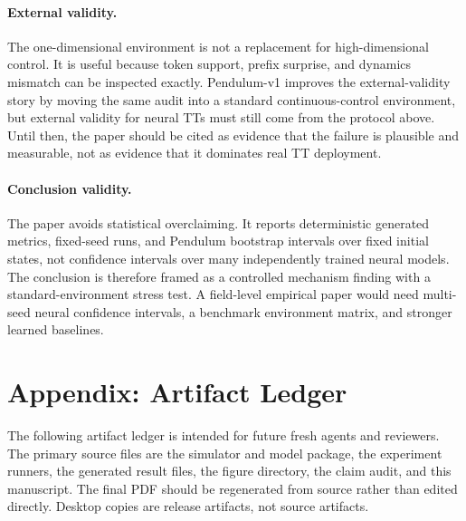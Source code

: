 \documentclass{article}
\begin{document}
\paragraph{External validity.}
The one-dimensional environment is not a replacement for high-dimensional control. It is useful because token support, prefix surprise, and dynamics mismatch can be inspected exactly. Pendulum-v1 improves the external-validity story by moving the same audit into a standard continuous-control environment, but external validity for neural TTs must still come from the protocol above. Until then, the paper should be cited as evidence that the failure is plausible and measurable, not as evidence that it dominates real TT deployment.

\paragraph{Conclusion validity.}
The paper avoids statistical overclaiming. It reports deterministic generated metrics, fixed-seed runs, and Pendulum bootstrap intervals over fixed initial states, not confidence intervals over many independently trained neural models. The conclusion is therefore framed as a controlled mechanism finding with a standard-environment stress test. A field-level empirical paper would need multi-seed neural confidence intervals, a benchmark environment matrix, and stronger learned baselines.

\section{Appendix: Artifact Ledger}

The following artifact ledger is intended for future fresh agents and reviewers. The primary source files are the simulator and model package, the experiment runners, the generated result files, the figure directory, the claim audit, and this manuscript. The final PDF should be regenerated from source rather than edited directly. Desktop copies are release artifacts, not source artifacts.
\end{document}

